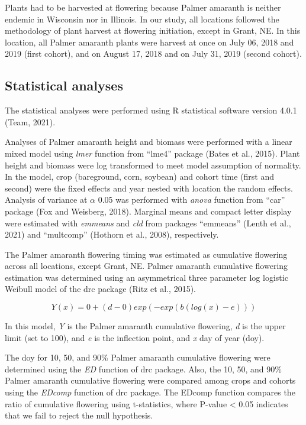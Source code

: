 \documentclass[utf8]{frontiersSCNS}
\begin{document}
Plants had to be harvested at flowering because Palmer amaranth is
neither endemic in Wisconsin nor in Illinois. In our study, all
locations followed the methodology of plant harvest at flowering
initiation, except in Grant, NE. In this location, all Palmer amaranth
plants were harvest at once on July 06, 2018 and 2019 (first cohort),
and on August 17, 2018 and on July 31, 2019 (second cohort).

\hypertarget{statistical-analyses}{%
\subsection*{Statistical analyses}\label{statistical-analyses}}

The statistical analyses were performed using R statistical software
version 4.0.1 (Team, 2021).

Analyses of Palmer amaranth height and biomass were performed with a
linear mixed model using \emph{lmer} function from ``lme4'' package
(Bates et al., 2015). Plant height and biomass were log transformed to
meet model assumption of normality. In the model, crop (bareground,
corn, soybean) and cohort time (first and second) were the fixed effects
and year nested with location the random effects. Analysis of variance
at \(\alpha\) 0.05 was performed with \emph{anova} function from ``car''
package (Fox and Weisberg, 2018). Marginal means and compact letter
display were estimated with \emph{emmeans} and \emph{cld} from packages
``emmeans'' (Lenth et al., 2021) and ``multcomp'' (Hothorn et al.,
2008), respectively.

The Palmer amaranth flowering timing was estimated as cumulative
flowering across all locations, except Grant, NE. Palmer amaranth
cumulative flowering estimation was determined using an asymmetrical
three parameter log logistic Weibull model of the drc package (Ritz et
al., 2015).

\[Y(x) = 0 + (d-0) exp (-exp(b(log(x)-e)))\]

In this model, \emph{Y} is the Palmer amaranth cumulative flowering,
\emph{d} is the upper limit (set to 100), and \emph{e} is the inflection
point, and \emph{x} day of year (doy).

The doy for 10, 50, and 90\% Palmer amaranth cumulative flowering were
determined using the \emph{ED} function of drc package. Also, the 10,
50, and 90\% Palmer amaranth cumulative flowering were compared among
crops and cohorts using the \emph{EDcomp} function of drc package. The
EDcomp function compares the ratio of cumulative flowering using
t-statistics, where P-value \textless{} 0.05 indicates that we fail to
reject the null hypothesis.
\end{document}
